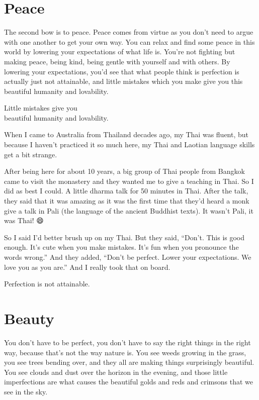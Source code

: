 \documentclass[12pt, openany]{book}
\newenvironment{aphorism}%
{%
\begin{center}\begin{itshape}
}%
{\end{itshape}\end{center}
}%
\begin{document}
\section*{Peace}

The second bow is to peace. Peace comes from virtue as you don’t need to argue with one another to get your own way. You can relax and find some peace in this world by lowering your expectations of what life is. You’re not fighting but making peace, being kind, being gentle with yourself and with others. By lowering your expectations, you’d see that what people think is perfection is actually just not attainable, and little mistakes which you make give you this beautiful humanity and lovability. 

\begin{aphorism}
Little mistakes give you\\  
beautiful humanity and lovability.
\end{aphorism}

When I came to Australia from Thailand decades ago, my Thai was fluent, but because I haven’t practiced it so much here, my Thai and Laotian language skills get a bit strange. 

After being here for about 10 years, a big group of Thai people from Bangkok came to visit the monastery and they wanted me to give a teaching in Thai. So I did as best I could. A little dharma talk for 50 minutes in Thai. After the talk, they said that it was amazing as it was the first time that they’d heard a monk give a talk in Pali (the language of the ancient Buddhist texts). It wasn’t Pali, it was Thai! 😄

So I said I’d better brush up on my Thai. But they said, “Don’t. This is good enough. It’s cute when you make mistakes. It’s fun when you pronounce the words wrong.” And they added, “Don’t be perfect. Lower your expectations. We love you as you are.” And I really took that on board. 

\begin{aphorism}
Perfection is not attainable.
\end{aphorism}

\section*{Beauty}

You don’t have to be perfect, you don’t have to say the right things in the right way, because that’s not the way nature is. You see weeds growing in the grass, you see trees bending over, and they all are making things surprisingly beautiful. You see clouds and dust over the horizon in the evening, and those little imperfections are what causes the beautiful golds and reds and crimsons that we see in the sky. 
\end{document}

